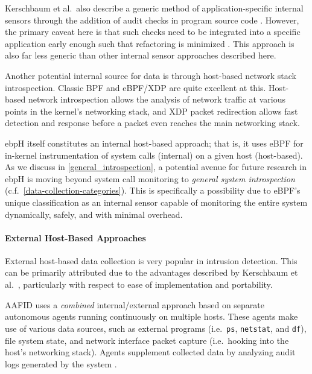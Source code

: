 \documentclass[
  12pt]{findlay}
\newcommand{\passthrough}[1]{#1}
\begin{document}
Kerschbaum et al.~also describe a generic method of application-specific
internal sensors through the addition of audit checks in program source
code \autocite{spafford02}. However, the primary caveat here is that
such checks need to be integrated into a specific application early
enough such that refactoring is minimized \autocite{peng95,spafford02}.
This approach is also far less generic than other internal sensor
approaches described here.

Another potential internal source for data is through host-based network
stack introspection. Classic BPF \autocite{bpf} and eBPF/XDP
\autocite{starovoitov13,starovoitov14,bcc,hoiland18} are quite excellent
at this. Host-based network introspection allows the analysis of network
traffic at various points in the kernel's networking stack, and XDP
packet redirection \autocite{hoiland18} allows fast detection and
response before a packet even reaches the main networking stack.

ebpH itself constitutes an internal host-based approach; that is, it
uses eBPF for in-kernel instrumentation of system calls (internal) on a
given host (host-based). As we discuss in
\autoref{general_introspection}, a potential avenue for future research
in ebpH is moving beyond system call monitoring to \emph{general system
introspection} (c.f.~\autoref{data-collection-categories}). This is
specifically a possibility due to eBPF's unique classification as an
internal sensor capable of monitoring the entire system dynamically,
safely, and with minimal overhead.

\hypertarget{external-host-based-approaches}{%
\paragraph{External Host-Based
Approaches}\label{external-host-based-approaches}}

External host-based data collection is very popular in intrusion
detection. This can be primarily attributed due to the advantages
described by Kerschbaum et al.~\autocite{spafford02}, particularly with
respect to ease of implementation and portability.

AAFID \autocite{spafford00} uses a \emph{combined} internal/external
approach based on separate autonomous agents running continuously on
multiple hosts. These agents make use of various data sources, such as
external programs (i.e.~\passthrough{\lstinline!ps!},
\passthrough{\lstinline!netstat!}, and \passthrough{\lstinline!df!}),
file system state, and network interface packet capture (i.e.~hooking
into the host's networking stack). Agents supplement collected data by
analyzing audit logs generated by the system \autocite{spafford02}.
\end{document}
